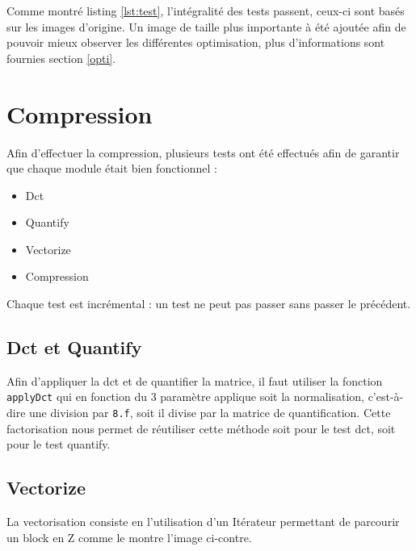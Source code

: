 \documentclass[a4paper, 11pt]{article}
\begin{document}
	Comme montré listing \ref{lst:test}, l'intégralité des tests passent, ceux-ci sont basés sur les images d'origine. Un image de taille plus importante à été
	ajoutée afin de pouvoir mieux observer les différentes optimisation, plus d'informations sont fournies section \ref{opti}.

	\section{Compression}
	Afin d'effectuer la compression, plusieurs tests ont été effectués afin de garantir que chaque module était bien fonctionnel : 
	\begin{itemize}
		\item Dct
		\item Quantify
		\item Vectorize
		\item Compression
	\end{itemize}

	Chaque test est incrémental : un test ne peut pas passer sans passer le précédent.

	\subsection{Dct et Quantify}
	Afin d'appliquer la dct et de quantifier la matrice, il faut utiliser la fonction \texttt{applyDct} qui en fonction du 3\ieme{} paramètre applique soit la
	normalisation, c'est-à-dire une division par \texttt{8.f}, soit il divise par la matrice de quantification. Cette factorisation nous permet de réutiliser
	cette méthode soit pour le test dct, soit pour le test quantify. 

	\subsection{Vectorize}
	La vectorisation consiste en l'utilisation d'un Itérateur permettant de parcourir un block en Z comme le montre l'image ci-contre.
\end{document}
